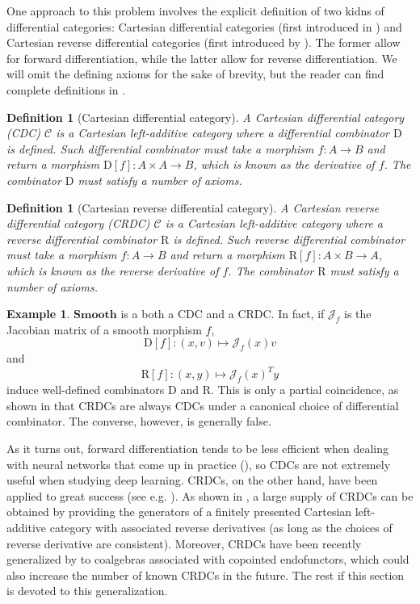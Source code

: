 \documentclass[11pt,a4paper,openright,twoside]{report}
\newcounter{mycounter}
\theoremstyle{plain}
\newtheorem{definition}[mycounter]{Definition}
\theoremstyle{definition}
\newtheorem{example}[mycounter]{Example}
\begin{document}
One approach to this problem involves the explicit definition of two kidns of differential categories: Cartesian differential categories (first introduced in \cite{blute2006differential}) and Cartesian reverse differential categories (first introduced by \cite{cockett2019reverse}). The former allow for forward differentiation, while the latter allow for reverse differentiation. We will omit the defining axioms for the sake of brevity, but the reader can find complete definitions in \cite{cockett2019reverse}.

\begin{definition}[Cartesian differential category]
  \label{def: cdc}
  A Cartesian differential category (CDC) $\mathcal{C}$ is a Cartesian left-additive category where a differential combinator $\mathrm{D}$ is defined. Such differential combinator must take a morphism $f: A \to B$ and return a morphism $\mathrm{D}[f]: A \times A \to B$, which is known as the derivative of $f$. The combinator $\mathrm{D}$ must satisfy a number of axioms. 
\end{definition}

\begin{definition}[Cartesian reverse differential category]
  A Cartesian reverse differential category (CRDC) $\mathcal{C}$ is a Cartesian left-additive category where a reverse differential combinator $\mathrm{R}$ is defined. Such reverse differential combinator must take a morphism $f: A \to B$ and return a morphism $\mathrm{R}[f]: A \times B \to A$, which is known as the reverse derivative of $f$. The combinator $\mathrm{R}$ must satisfy a number of axioms. 
\end{definition}

\begin{example}
  \label{ex: smooth}
  $\mathbf{Smooth}$ is a both a CDC and a CRDC. In fact, if $\mathcal{J}_f$ is the Jacobian matrix of a smooth morphism $f$,
  \[\mathrm{D}[f]: (x,v) \mapsto \mathcal{J}_f(x)v\]
  and
  \[\mathrm{R}[f]: (x,y) \mapsto \mathcal{J}_f(x)^Ty\]
  induce well-defined combinators $\mathrm{D}$ and $\mathrm{R}$. This is only a partial coincidence, as shown in \cite{cockett2019reverse} that CRDCs are always CDCs under a canonical choice of differential combinator. The converse, however, is generally false.
\end{example}


As it turns out, forward differentiation tends to be less efficient when dealing with neural networks that come up in practice (\cite{elliott2018simple}), so CDCs are not extremely useful when studying deep learning. CRDCs, on the other hand, have been applied to great success (see e.g. \cite{cruttwell2022categorical}). As shown in \cite{wilson2022categories}, a large supply of CRDCs can be obtained by providing the generators of a finitely presented Cartesian left-additive category with associated reverse derivatives (as long as the choices of reverse derivative are consistent).
Moreover, CRDCs have been recently generalized by \cite{gavranovic2024fundamental} to coalgebras associated with copointed endofunctors, which could also increase the number of known CRDCs in the future. The rest if this section is devoted to this generalization.
\end{document}
